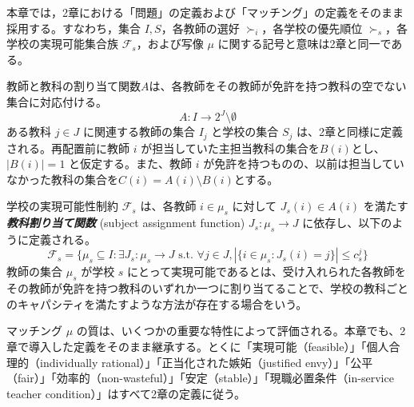 \documentclass[12pt, a4paper]{article}
\theoremstyle{definition}
\theoremstyle{remark}
\theoremstyle{plain}
\begin{document}


本章では，2章における「問題」の定義および「マッチング」の定義をそのまま採用する。すなわち，集合 $I, S$，各教師の選好 $\succ_i$，各学校の優先順位 $\succ_s$，各学校の実現可能集合族 $\mathcal{F}_s$，および写像 $\mu$ に関する記号と意味は2章と同一である。



教師と教科の割り当て関数$A$は、各教師をその教師が免許を持つ教科の空でない集合に対応付ける。
\[
A: I \to 2^J\setminus {\emptyset}
\]
ある教科 $j \in J$ に関連する教師の集合 $I_j$ と学校の集合 $S_j$ は、2章と同様に定義される。再配置前に教師 $i$ が担当していた主担当教科の集合を$B(i)$とし、$|B(i)| = 1$ と仮定する。また、教師 $i$ が免許を持つものの、以前は担当していなかった教科の集合を$C(i) = A(i) \setminus B(i)$とする。

学校の実現可能性制約 $\mathcal{F}_s$ は、各教師 $i \in \mu_s$ に対して $J_s(i) \in A(i)$ を満たす\textbf{\textit{教科割り当て関数}} (subject assignment function) $J_s : \mu_s \rightarrow J$ に依存し、以下のように定義される。
\[
\mathcal{F}_s =\{\mu_s \subseteq I : \exists J_s:\mu_s \to J \text{ s.t. } \forall j \in J, |\{i \in \mu_s : J_s(i)= j\}| \leq c_s^j\}
\]
教師の集合 $\mu_s$ が学校 $s$ にとって実現可能であるとは、受け入れられた各教師をその教師が免許を持つ教科のいずれか一つに割り当てることで、学校の教科ごとのキャパシティを満たすような方法が存在する場合をいう。


マッチング $\mu$ の質は、いくつかの重要な特性によって評価される。本章でも、2章で導入した定義をそのまま継承する。とくに「実現可能（feasible）」「個人合理的（individually rational）」「正当化された嫉妬（justified envy）」「公平（fair）」「効率的（non-wasteful）」「安定（stable）」「現職必置条件（in-service teacher condition）」はすべて2章の定義に従う。
\end{document}
